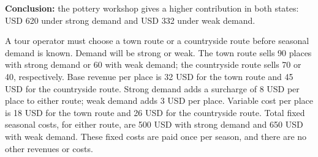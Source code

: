 \textbf{Conclusion:} the pottery workshop gives a higher contribution in both states: USD 620 under strong demand and USD 332 under weak demand.

\clearpage
{}
\begingroup\setlength{\parskip}{2pt}\linespread{1.02}\selectfont
A tour operator must choose a town route or a countryside route before seasonal demand is known. Demand will be strong or weak. The town route sells 90 places with strong demand or 60 with weak demand; the countryside route sells 70 or 40, respectively. Base revenue per place is 32 USD for the town route and 45 USD for the countryside route. Strong demand adds a surcharge of 8 USD per place to either route; weak demand adds 3 USD per place. Variable cost per place is 18 USD for the town route and 26 USD for the countryside route. Total fixed seasonal costs, for either route, are 500 USD with strong demand and 650 USD with weak demand. These fixed costs are paid once per season, and there are no other revenues or costs.
